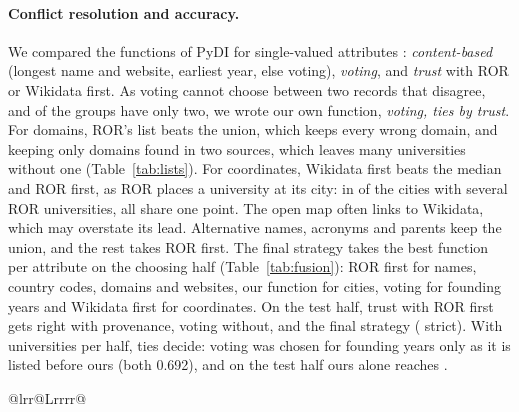 \documentclass[runningheads,a4paper]{llncs}
\begin{document}
\paragraph{Conflict resolution and accuracy.} We compared the functions of PyDI for single-valued
attributes \cite{bleiholder2009fusion}: \emph{content-based} (longest name and website, earliest year, else voting),
\emph{voting}, and \emph{trust} with ROR or Wikidata first. As voting cannot choose between two
records that disagree, and \nTwo{} of the \nMulti{} groups have only two, we wrote our own function,
\emph{voting, ties by trust}. For domains, ROR's list beats the union, which keeps every wrong domain, and
keeping only domains found in two sources, which leaves many universities without one
(Table~\ref{tab:lists}). For coordinates, Wikidata first beats the median and ROR first, as ROR places a
university at its city: in \rorCitiesOnePoint{} of the \rorCitiesSeveral{} cities with several ROR
universities, all share one point. The open map often links to Wikidata, which may overstate its lead.
Alternative names, acronyms and parents keep
the union, and the rest takes ROR first. The final strategy takes the best function per attribute
on the choosing half (Table~\ref{tab:fusion}): ROR first for names, country codes, domains and websites,
our function for cities, voting for founding years and Wikidata first for coordinates. On the test half,
trust with ROR first gets \accTrustRorTest{} right with provenance, voting \accVotingTest{} without, and the
final strategy \accFinal{} (\accFinalStrict{} strict). With \goldUsed{} universities per half, ties
decide: voting was chosen for founding years only as it is listed before ours (both 0.692), and on the
test half ours alone reaches \accOursTest{}.

\begin{table}[H]
\caption{Functions for domains and coordinates. Domains: accuracy on the choosing half, and linked
universities without a domain. Coordinates: share within 1 or 5\,km of the gold point, for the
\coordChooseN{} and \coordTestN{} universities with one. Green: best}\label{tab:lists}
\scriptsize
\setlength{\tabcolsep}{3pt}
\begin{tabularx}{\textwidth}{@{}lrr@{\hspace{1.5em}}Lrrrr@{}}
\toprule
{}
\bottomrule
\end{tabularx}
\end{table}
\end{document}
